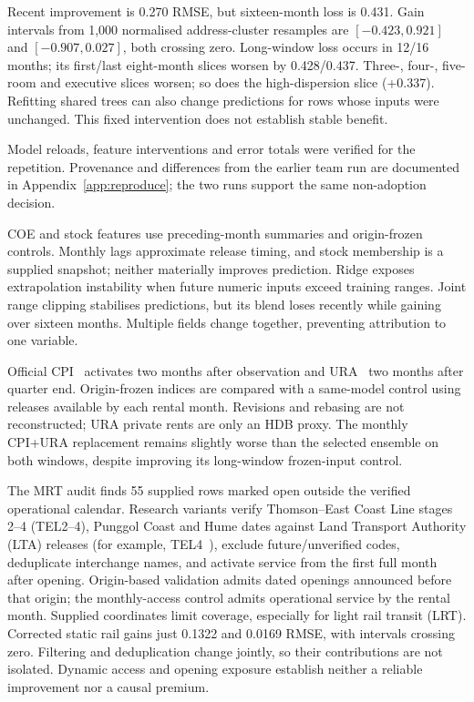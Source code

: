 \documentclass[conference]{IEEEtran}
\begin{document}
Recent improvement is 0.270 RMSE, but sixteen-month loss is 0.431. Gain intervals from 1,000 normalised address-cluster resamples are $[-0.423,0.921]$ and $[-0.907,0.027]$, both crossing zero. Long-window loss occurs in 12/16 months; its first/last eight-month slices worsen by 0.428/0.437. Three-, four-, five-room and executive slices worsen; so does the high-dispersion slice (+0.337). Refitting shared trees can also change predictions for rows whose inputs were unchanged. This fixed intervention does not establish stable benefit.

Model reloads, feature interventions and error totals were verified for the repetition. Provenance and differences from the earlier team run are documented in Appendix~\ref{app:reproduce}; the two runs support the same non-adoption decision.

COE and stock features use preceding-month summaries and origin-frozen controls. Monthly lags approximate release timing, and stock membership is a supplied snapshot; neither materially improves prediction. Ridge exposes extrapolation instability when future numeric inputs exceed training ranges. Joint range clipping stabilises predictions, but its blend loses recently while gaining over sixteen months. Multiple fields change together, preventing attribution to one variable.

Official CPI~\cite{cpi} activates two months after observation and URA~\cite{ura} two months after quarter end. Origin-frozen indices are compared with a same-model control using releases available by each rental month. Revisions and rebasing are not reconstructed; URA private rents are only an HDB proxy. The monthly CPI+URA replacement remains slightly worse than the selected ensemble on both windows, despite improving its long-window frozen-input control.

The MRT audit finds 55 supplied rows marked open outside the verified operational calendar. Research variants verify Thomson--East Coast Line stages 2--4 (TEL2--4), Punggol Coast and Hume dates against Land Transport Authority (LTA) releases (for example, TEL4~\cite{lta}), exclude future/unverified codes, deduplicate interchange names, and activate service from the first full month after opening. Origin-based validation admits dated openings announced before that origin; the monthly-access control admits operational service by the rental month. Supplied coordinates limit coverage, especially for light rail transit (LRT). Corrected static rail gains just 0.1322 and 0.0169 RMSE, with intervals crossing zero. Filtering and deduplication change jointly, so their contributions are not isolated. Dynamic access and opening exposure establish neither a reliable improvement nor a causal premium.
\end{document}
